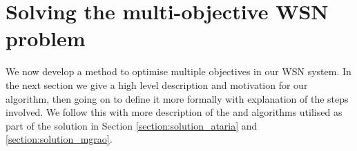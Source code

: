 \section{Solving the multi-objective WSN problem}
\label{section:solution}

We now develop a method to optimise multiple objectives in our WSN system. In the next section we give a high level description and motivation for our algorithm, then going on to define it more formally with explanation of the steps involved. We follow this with more description of the \acronymATARIA{}{} and \acronymMGRAO{}{} algorithms utilised as part of the solution in Section \ref{section:solution_ataria} and \ref{section:solution_mgrao}.
